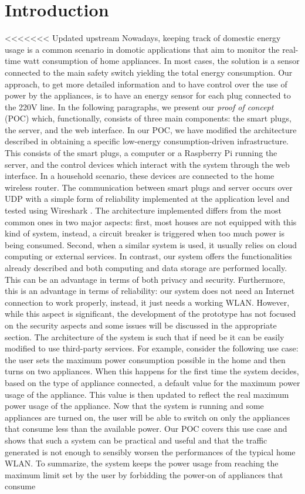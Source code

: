 \documentclass[conference]{IEEEtran}
\begin{document}
	\section{Introduction}
<<<<<<< Updated upstream
	Nowadays, keeping track of domestic energy usage is a common scenario in domotic applications that aim to monitor the real-time watt consumption of home appliances. In most cases, the solution is a sensor connected to the main safety switch yielding the total energy consumption. Our approach, to get more detailed information and to have control over the use of power by the appliances, is to have an energy sensor for each plug connected to the 220V line. In the following paragraphs, we present our \textit{proof of concept} (POC) which, functionally, consists of three main components: the smart plugs, the server, and the web interface. In our POC, we have modified the architecture described in \cite{8110428} obtaining a specific low-energy consumption-driven infrastructure. This consists of the smart plugs, a computer or a Raspberry Pi running the server, and the control devices which interact with the system through the web interface. In a household scenario, these devices are connected to the home wireless router. The communication between smart plugs and server occurs over UDP with a simple form of reliability implemented at the application level and tested using Wireshark \cite{wireshark}. The architecture implemented differs from the most common ones in two major aspects: first, most houses are not equipped with this kind of system, instead, a circuit breaker is triggered when too much power is being consumed. Second, when a similar system is used, it usually relies on cloud computing or external services. In contrast, our system offers the functionalities already described and both computing and data storage are performed locally. This can be an advantage in terms of both privacy and security. Furthermore, this is an advantage in terms of reliability: our system does not need an Internet connection to work properly, instead, it just needs a working WLAN. However, while this aspect is significant, the development of the prototype has not focused on the security aspects and some issues will be discussed in the appropriate section. The architecture of the system is such that if need be it can be easily modified to use third-party services. For example, consider the following use case: the user sets the maximum power consumption possible in the home and then turns on two appliances. When this happens for the first time the system decides, based on the type of appliance connected, a default value for the maximum power usage of the appliance. This value is then updated to reflect the real maximum power usage of the appliance. Now that the system is running and some appliances are turned on, the user will be able to switch on only the appliances that consume less than the available power. Our POC covers this use case and shows that such a system can be practical and useful and that the traffic generated is not enough to sensibly worsen the performances of the typical home WLAN. To summarize, the system keeps the power usage from reaching the maximum limit set by the user by forbidding the power-on of appliances that consume 
\end{document}
